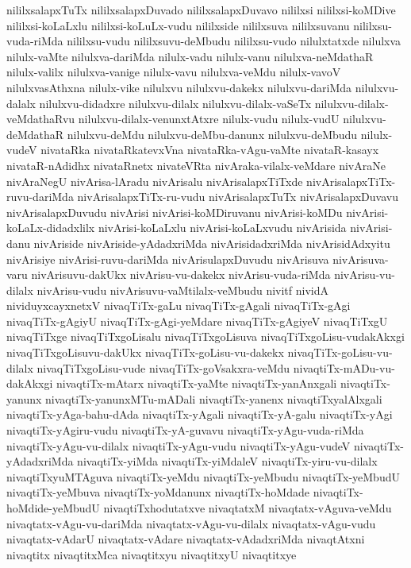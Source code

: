 {nililxsalapxTuTx
nililxsalapxDuvado
nililxsalapxDuvavo
nililxsi
nililxsi-koMDive
nililxsi-koLaLxlu
nililxsi-koLuLx-vudu
nililxside
nililxsuva
nililxsuvanu
nililxsu-vuda-riMda
nililxsu-vudu
nililxsuvu-deMbudu
nililxsu-vudo
nilulxtatxde
nilulxva
nilulx-vaMte
nilulxva-dariMda
nilulx-vadu
nilulx-vanu
nilulxva-neMdathaR
nilulx-valilx
nilulxva-vanige
nilulx-vavu
nilulxva-veMdu
nilulx-vavoV
nilulxvasAthxna
nilulx-vike
nilulxvu
nilulxvu-dakekx
nilulxvu-dariMda
nilulxvu-dalalx
nilulxvu-didadxre
nilulxvu-dilalx
nilulxvu-dilalx-vaSeTx
nilulxvu-dilalx-veMdathaRvu
nilulxvu-dilalx-venunxtAtxre
nilulx-vudu
nilulx-vudU
nilulxvu-deMdathaR
nilulxvu-deMdu
nilulxvu-deMbu-danunx
nilulxvu-deMbudu
nilulx-vudeV
nivataRka
nivataRkatevxVna
nivataRka-vAgu-vaMte
nivataR-kasayx
nivataR-nAdidhx
nivataRnetx
nivateVRta
nivAraka-vilalx-veMdare
nivAraNe
nivAraNegU
nivArisa-lAradu
nivArisalu
nivArisalapxTiTxde
nivArisalapxTiTx-ruvu-dariMda
nivArisalapxTiTx-ru-vudu
nivArisalapxTuTx
nivArisalapxDuvavu
nivArisalapxDuvudu
nivArisi
nivArisi-koMDiruvanu
nivArisi-koMDu
nivArisi-koLaLx-didadxlilx
nivArisi-koLaLxlu
nivArisi-koLaLxvudu
nivArisida
nivArisi-danu
nivAriside
nivAriside-yAdadxriMda
nivArisidadxriMda
nivArisidAdxyitu
nivArisiye
nivArisi-ruvu-dariMda
nivArisulapxDuvudu
nivArisuva
nivArisuva-varu
nivArisuvu-dakUkx
nivArisu-vu-dakekx
nivArisu-vuda-riMda
nivArisu-vu-dilalx
nivArisu-vudu
nivArisuvu-vaMtilalx-veMbudu
nivitf
nividA
nividuyxcayxnetxV
nivaqTiTx-gaLu
nivaqTiTx-gAgali
nivaqTiTx-gAgi
nivaqTiTx-gAgiyU
nivaqTiTx-gAgi-yeMdare
nivaqTiTx-gAgiyeV
nivaqTiTxgU
nivaqTiTxge
nivaqTiTxgoLisalu
nivaqTiTxgoLisuva
nivaqTiTxgoLisu-vudakAkxgi
nivaqTiTxgoLisuvu-dakUkx
nivaqTiTx-goLisu-vu-dakekx
nivaqTiTx-goLisu-vu-dilalx
nivaqTiTxgoLisu-vude
nivaqTiTx-goVsakxra-veMdu
nivaqtiTx-mADu-vu-dakAkxgi
nivaqtiTx-mAtarx
nivaqtiTx-yaMte
nivaqtiTx-yanAnxgali
nivaqtiTx-yanunx
nivaqtiTx-yanunxMTu-mADali
nivaqtiTx-yanenx
nivaqtiTxyalAlxgali
nivaqtiTx-yAga-bahu-dAda
nivaqtiTx-yAgali
nivaqtiTx-yA-galu
nivaqtiTx-yAgi
nivaqtiTx-yAgiru-vudu
nivaqtiTx-yA-guvavu
nivaqtiTx-yAgu-vuda-riMda
nivaqtiTx-yAgu-vu-dilalx
nivaqtiTx-yAgu-vudu
nivaqtiTx-yAgu-vudeV
nivaqtiTx-yAdadxriMda
nivaqtiTx-yiMda
nivaqtiTx-yiMdaleV
nivaqtiTx-yiru-vu-dilalx
nivaqtiTxyuMTAguva
nivaqtiTx-yeMdu
nivaqtiTx-yeMbudu
nivaqtiTx-yeMbudU
nivaqtiTx-yeMbuva
nivaqtiTx-yoMdanunx
nivaqtiTx-hoMdade
nivaqtiTx-hoMdide-yeMbudU
nivaqtiTxhodutatxve
nivaqtatxM
nivaqtatx-vAguva-veMdu
nivaqtatx-vAgu-vu-dariMda
nivaqtatx-vAgu-vu-dilalx
nivaqtatx-vAgu-vudu
nivaqtatx-vAdarU
nivaqtatx-vAdare
nivaqtatx-vAdadxriMda
nivaqtAtxni
nivaqtitx
nivaqtitxMca
nivaqtitxyu
nivaqtitxyU
nivaqtitxye
}
